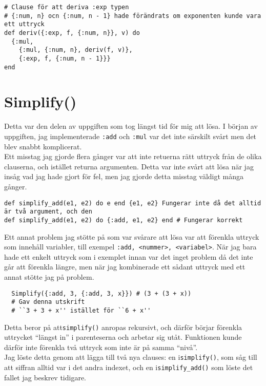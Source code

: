 \documentclass[a4paper,11pt]{article}
\begin{document}
\begin{verbatim}
# Clause för att deriva :exp typen
# {:num, n} ocn {:num, n - 1} hade förändrats om exponenten kunde vara ett uttryck
def deriv({:exp, f, {:num, n}}, v) do
  {:mul,
    {:mul, {:num, n}, deriv(f, v)},
    {:exp, f, {:num, n - 1}}}
end
\end{verbatim}


\section*{Simplify()}
Detta var den delen av uppgiften som tog längst tid för mig att lösa. I början av uppgiften, jag implementerade {\tt:add} och {\tt:mul} var det inte särskilt svårt men det blev snabbt komplicerat.\\
Ett misstag jag gjorde flera gånger var att inte retuerna rätt uttryck från de olika clauserna, och istället returna argumenten. Detta var inte svårt att lösa när jag insåg vad jag hade gjort för fel, men jag gjorde detta misstag väldigt många gånger.

\begin{verbatim}
def simplify_add(e1, e2) do e end {e1, e2} Fungerar inte då det alltid är två argument, och den 
def simplify_add(e1, e2) do {:add, e1, e2} end # Fungerar korrekt
\end{verbatim}

Ett annat problem jag stötte på som var svårare att lösa var att förenkla uttryck som innehåll variabler, till exempel {\tt{:add, <nummer>, <variabel>}}. När jag bara hade ett enkelt uttryck som i exemplet innan var det inget problem då det inte går att förenkla längre, men när jag kombinerade ett sådant uttryck med ett annat stötte jag på problem.

\begin{verbatim}
  Simplify({:add, 3, {:add, 3, x}}) # (3 + (3 + x))
  # Gav denna utskrift
  # ``3 + 3 + x'' istället för ``6 + x''
\end{verbatim}

Detta beror på att{\tt simplify()} anropas rekursivt, och därför börjar förenkla uttrycket ``längst in'' i parenteserna och arbetar sig utåt. Funktionen kunde därför inte förenkla två uttryck som inte är på samma ``nivå''.\\ %
Jag löste detta genom att lägga till två nya clauses: en i{\tt simplify()}, som såg till att siffran alltid var i det andra indexet, och en i{\tt simplify_add()} som löste det fallet jag beskrev tidigare.
\end{document}
